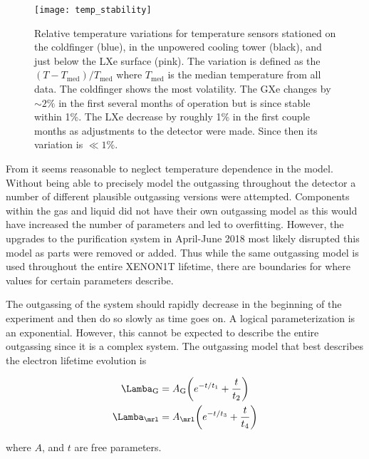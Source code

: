 \begin{figure}
\centering
\texttt{[image: temp\_stability]}
\caption{Relative temperature variations for temperature sensors stationed on the  coldfinger (blue), in the unpowered cooling
tower (black), and just below the LXe surface (pink).  The variation is defined as the $(T - T_{\mathrm{med}}) / T_{\mathrm{med}}$ where
$T_{\mathrm{med}}$ is the median temperature from all data.  The  coldfinger shows the most volatility.  The GXe changes by
${\sim}2\%$ in the first several months of operation but is since stable within 1\%.  The LXe decrease by roughly 1\% in the first couple
months as adjustments to the detector were made.  Since then its variation is $\ll 1\%$.}
\label{fig:electron_lifetime_model_outgassing_temp_stability}
\end{figure}

From  it seems reasonable to neglect temperature dependence in the model.  Without
being able to precisely model the outgassing throughout the detector a number of different plausible outgassing versions were
attempted.  Components within the gas and liquid did not have their own outgassing model as this would have increased the number of
parameters and led to overfitting.  However, the upgrades to the purification system in April-June 2018 most likely disrupted this model
as parts were removed or added.  Thus while the same outgassing model is used throughout the entire XENON1T lifetime, there are boundaries
for where values for certain parameters describe.

The outgassing of the system should rapidly decrease in the beginning of the experiment and then do so slowly as time goes on.  A
logical parameterization is an exponential.  However, this cannot be expected to describe the entire outgassing since it is a complex
system.  The outgassing model that best describes the electron lifetime evolution is

\begin{subequations}
\begin{align}
\Lamba_{\mrg} &= A_{\mrg} \bigg( e^{-t/t_1} + \frac{t}{t_2} \bigg) \\
\Lamba_{\mrl} &= A_{\mrl} \bigg( e^{-t/t_3} + \frac{t}{t_4} \bigg)
\end{align}
\end{subequations}

\noindent where $A$, and $t$ are free parameters.



